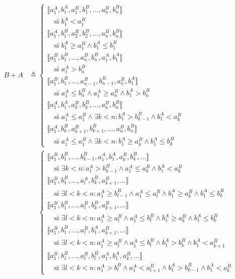 \begin{enumerate}
\begin{align*}
B + A &\triangleq \begin{cases}
  \llbracket a_1^A, b_1^A, a_1^B, b_1^B, \ldots, a_n^B, b_n^B \rrbracket \\
  \quad \text{si } b_1^A < a_1^B \\
  \llbracket a_1^A, b_1^B, a_2^B, b_2^B, \ldots, a_n^B, b_n^B \rrbracket \\
  \quad \text{si } b_1^A \ge a_1^B \land b_1^A \le b_1^B \\
  \llbracket a_1^B, b_1^B, \ldots, a_n^B, b_n^B, a_1^A, b_1^A \rrbracket \\
  \quad \text{si } a_1^A > b_n^B \\
  \llbracket a_1^B, b_1^B, \ldots, a_{n-1}^B, b_{n-1}^B, a_n^B, b_1^A \rrbracket \\
  \quad \text{si } a_1^A \le b_n^B \land a_1^A \ge a_n^B \land b_1^A > b_n^B \\
  \llbracket a_1^A, b_1^A, a_k^B, b_k^B, \ldots, a_n^B, b_n^B \rrbracket \\
  \quad \text{si } a_1^A \le a_1^B \land \exists k<n : b_1^A > b_{k-1}^B \land b_1^A < a_k^B \\
  \llbracket a_1^A, b_k^B, a_{k+1}^B, b_{k+1}^B, \ldots, a_n^B, b_n^B \rrbracket \\
  \quad \text{si } a_1^A \le a_1^B \land \exists k<n : b_1^A \ge a_k^B \land b_1^A \le b_k^B
\end{cases} \\[1em]
&\phantom{\triangleq} \begin{cases}
  \llbracket a_1^B, b_1^B, \ldots, b_{k-1}^B, a_1^A, b_1^A, a_k^B, b_k^B, \ldots \rrbracket \\
  \quad \text{si } \exists k<n : a_1^A > b_{k-1}^B \land a_1^A \le a_k^B \land b_1^A < a_k^B \\
  \llbracket a_1^B, b_1^B, \ldots, a_l^A, b_k^B, a_{k+1}^B, \dots \rrbracket \\
  \quad \text{si } \exists l<k<n : a_1^A \ge b_{l-1}^B \land a_1^A \le a_l^B \land b_1^A \ge a_k^B \land b_1^A \le b_k^B \\
  \llbracket a_1^B, b_1^B, \ldots, a_l^B, b_k^B, a_{k+1}^B, \dots \rrbracket \\
  \quad \text{si } \exists l<k<n : a_1^A \ge a_l^B \land a_1^A \le b_l^B \land b_1^A \ge a_k^B \land b_1^A \le b_k^B \\
  \llbracket a_1^B, b_1^B, \ldots, a_l^B, b_1^A, a_{k+1}^B, \dots \rrbracket \\
  \quad \text{si } \exists l<k<n : a_1^A \ge a_l^B \land a_1^A \le b_l^B \land b_1^A > b_k^B \land b_1^A < a_{k+1}^B \\
  \llbracket a_1^B, b_1^B, \ldots, a_l^B, b_l^B, a_1^A, b_1^A, a_k^B, \dots \rrbracket \\
  \quad \text{si } \exists l<k<n : a_1^A > b_l^B \land a_1^A < a_{l+1}^B \land b_1^A > b_{k-1}^B \land b_1^A < a_k^B
\end{cases}
\end{align*}


\end{enumerate}
